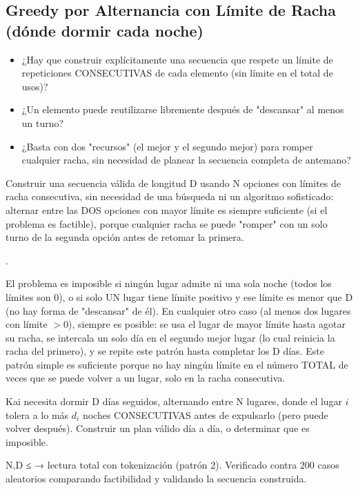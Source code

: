 \subsection{Greedy por Alternancia con Límite de Racha (dónde dormir cada noche)}


\begin{itemize}
\item ¿Hay que construir explícitamente una secuencia que respete un límite de repeticiones CONSECUTIVAS de cada elemento (sin límite en el total de usos)?
\item ¿Un elemento puede reutilizarse libremente después de "descansar" al menos un turno?
\item ¿Basta con dos "recursos" (el mejor y el segundo mejor) para romper cualquier racha, sin necesidad de planear la secuencia completa de antemano?
\end{itemize}

 Construir una secuencia válida de longitud D usando N opciones con límites de racha consecutiva, sin necesidad de una búsqueda ni un algoritmo sofisticado: alternar entre las DOS opciones con mayor límite es siempre suficiente (si el problema es factible), porque cualquier racha se puede "romper" con un solo turno de la segunda opción antes de retomar la primera.

 .

 El problema es imposible si ningún lugar admite ni una sola noche (todos los límites son 0), o si solo UN lugar tiene límite positivo y ese límite es menor que D (no hay forma de "descansar" de él). En cualquier otro caso (al menos dos lugares con límite $>0$), siempre es posible: se usa el lugar de mayor límite hasta agotar su racha, se intercala un solo día en el segundo mejor lugar (lo cual reinicia la racha del primero), y se repite este patrón hasta completar los D días. Este patrón simple es suficiente porque no hay ningún límite en el número TOTAL de veces que se puede volver a un lugar, solo en la racha consecutiva.


Kai necesita dormir D días seguidos, alternando entre N lugares, donde el lugar $i$ tolera a lo más $d_i$ noches CONSECUTIVAS antes de expulsarlo (pero puede volver después). Construir un plan válido día a día, o determinar que es imposible.

 N,D ≤  → lectura total con tokenización (patrón 2). Verificado contra 200 casos aleatorios comparando factibilidad y validando la secuencia construida.

